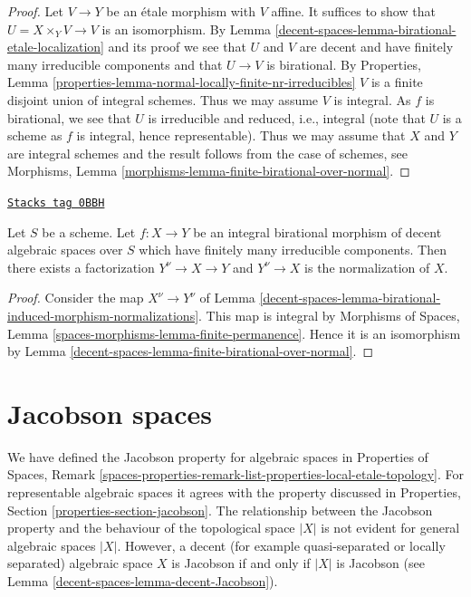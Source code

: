 \begin{proof}
Let $V \to Y$ be an \'etale morphism with $V$ affine. It suffices to show that
$U = X \times_Y V \to V$ is an isomorphism. By
Lemma \ref{decent-spaces-lemma-birational-etale-localization} and its proof
we see that $U$ and $V$ are decent and have finitely many
irreducible components and that $U \to V$ is birational.
By Properties, Lemma
\ref{properties-lemma-normal-locally-finite-nr-irreducibles}
$V$ is a finite disjoint union of integral schemes.
Thus we may assume $V$ is integral. As $f$ is birational, we
see that $U$ is irreducible and reduced, i.e., integral
(note that $U$ is a scheme as $f$ is integral, hence representable).
Thus we may assume that $X$ and $Y$ are integral schemes
and the result follows from the case of schemes, see
Morphisms, Lemma \ref{morphisms-lemma-finite-birational-over-normal}.
\end{proof}

\begin{lemma}
\label{decent-spaces-lemma-normalization-normal}
\href{https://stacks.math.columbia.edu/tag/0BBH}{\texttt{Stacks tag 0BBH}}

Let $S$ be a scheme. Let $f : X \to Y$ be an integral birational morphism of
decent algebraic spaces over $S$ which have finitely many irreducible
components. Then there exists a factorization $Y^\nu \to X \to Y$ and
$Y^\nu \to X$ is the normalization of $X$.
\end{lemma}

\begin{proof}
Consider the map $X^\nu \to Y^\nu$ of
Lemma \ref{decent-spaces-lemma-birational-induced-morphism-normalizations}.
This map is integral by
Morphisms of Spaces, Lemma \ref{spaces-morphisms-lemma-finite-permanence}.
Hence it is an isomorphism by
Lemma \ref{decent-spaces-lemma-finite-birational-over-normal}.
\end{proof}

\section{Jacobson spaces}
\label{decent-spaces-section-jacobson}
We have defined the Jacobson property for algebraic spaces in
Properties of Spaces, Remark
\ref{spaces-properties-remark-list-properties-local-etale-topology}.
For representable algebraic spaces it agrees with the property discussed in
Properties, Section \ref{properties-section-jacobson}.
The relationship between the Jacobson property and the behaviour of
the topological space $|X|$ is not evident for general algebraic spaces $|X|$.
However, a decent (for example quasi-separated or locally separated)
algebraic space $X$ is Jacobson if and only if $|X|$ is Jacobson
(see Lemma \ref{decent-spaces-lemma-decent-Jacobson}).

